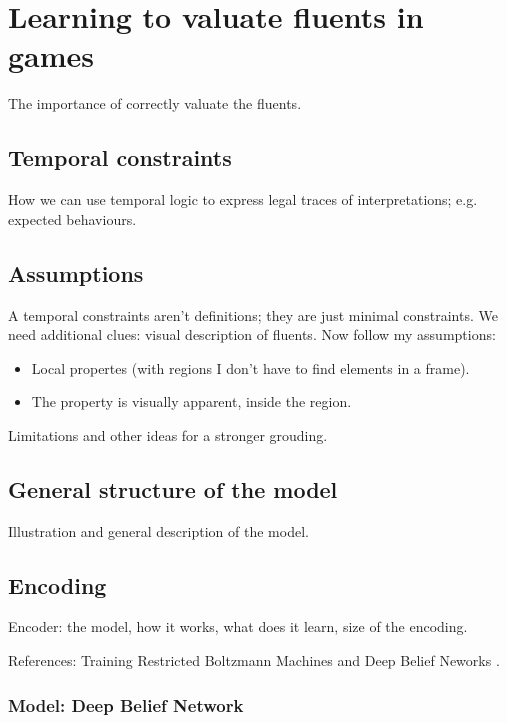 \chapter{Learning to valuate fluents in games}

\label{ch:fluents}

The importance of correctly valuate the fluents.

\section{Temporal constraints}

How we can use temporal logic to express legal traces of interpretations;
e.g. expected behaviours.

\section{Assumptions}

A temporal constraints aren't definitions; they are just minimal constraints.
We need additional clues: visual description of fluents.
Now follow my assumptions:
\begin{itemize}
	\item Local propertes (with regions I don't have to find elements in a
		frame).
	\item The property is visually apparent, inside the region.
\end{itemize}

Limitations and other ideas for a stronger grouding.

\section{General structure of the model}

Illustration and general description of the model.

\section{Encoding}

Encoder: the model, how it works, what does it learn, size of the encoding.

References:
Training Restricted Boltzmann Machines and Deep Belief Neworks
\cite{bib:rbm-training}\cite{bib:ml-book-murphy}.

\subsection{Model: Deep Belief Network}

